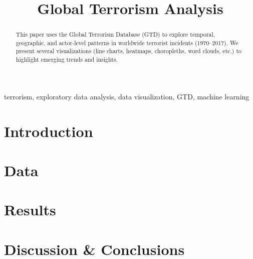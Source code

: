\documentclass[conference]{IEEEtran}
\begin{document}
\title{Global Terrorism Analysis}

\author{
  \vspace{0.5em}
}

\maketitle

\begin{abstract}
This paper uses the Global Terrorism Database (GTD) to explore temporal, geographic, and actor‐level patterns in worldwide terrorist incidents (1970–2017). We present several visualizations (line charts, heatmaps, choropleths, word clouds, etc.) to highlight emerging trends and insights.
\end{abstract}

\begin{IEEEkeywords}
terrorism, exploratory data analysis, data visualization, GTD, machine learning
\end{IEEEkeywords}

\section{Introduction}
\label{sec:intro}


\section{Data}
\label{sec:data}


\section{Results}
\label{sec:results}


\section{Discussion \& Conclusions}
\label{sec:discussion}




\end{document}
